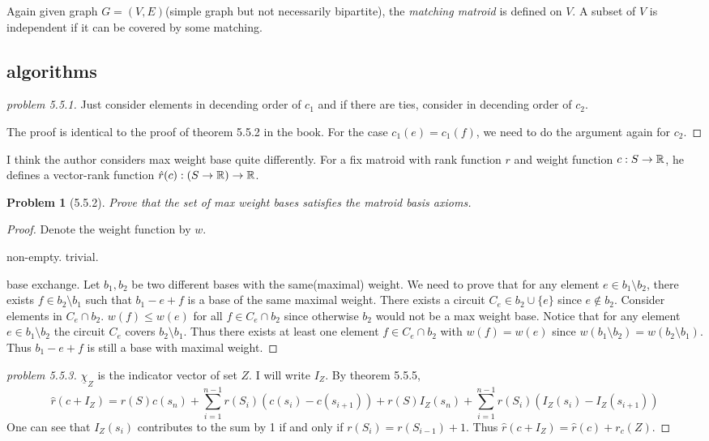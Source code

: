 \documentclass[12pt]{article}
\newtheorem*{nproblem}{Problem}
\begin{document}
Again given graph $G=(V,E)$(simple graph but not necessarily bipartite), the \emph{matching matroid} is defined on $V$. A subset of $V$ is independent if it can be covered by some matching. 

\subsection{algorithms}
\begin{proof}[problem 5.5.1]
    Just consider elements in decending order of $c_1$ and if there are ties, consider in decending order of $c_2$.

    The proof is identical to the proof of theorem 5.5.2 in the book. For the case $c_1(e)=c_1(f)$, we need to do the argument again for $c_2$.
\end{proof}

I think the author considers max weight base quite differently. For a fix matroid with rank function $r$ and weight function $c:S\to \R$, he defines a vector-rank function $\hat{r}(c):(S\to \R )\to \R$.

\begin{nproblem}[5.5.2]
    Prove that the set of max weight bases satisfies the matroid basis axioms.
\end{nproblem}
\begin{proof}
    Denote the weight function by $w$.

    non-empty. trivial.

    base exchange. Let $b_1,b_2$ be two different bases with the same(maximal) weight. We need to prove that for any element $e\in b_1\setminus b_2$, there exists $f\in b_2\setminus b_1$ such that $b_1-e+f$ is a base of the same maximal weight. There exists a circuit $C_e\in b_2\cup\{e\}$ since $e\notin b_2$. Consider elements in $C_e\cap b_2$. $w(f)\leq w(e)$ for all $f\in C_e\cap b_2$ since otherwise $b_2$ would not be a max weight base. Notice that for any element $e\in b_1\setminus b_2$ the circuit $C_e$ covers $b_2\setminus b_1$. Thus there exists at least one element $f\in C_e\cap b_2$ with $w(f)=w(e)$ since $w(b_1\setminus b_2)=w(b_2\setminus b_1)$. Thus $b_1-e+f$ is still a base with maximal weight.
\end{proof}

\begin{proof}[problem 5.5.3]
    $\underline{\chi}_{Z}$ is the indicator vector of set $Z$. I will write $I_Z$. By theorem 5.5.5, 
    \[
        \hat{r}(c+I_Z)=r(S)c(s_n)+\sum_{i=1}^{n-1} r(S_i)\left( c(s_i)-c(s_{i+1})\right)+r(S)I_Z(s_n)+\sum_{i=1}^{n-1} r(S_i)\left( I_Z(s_i)-I_Z(s_{i+1})\right)
    \]
    One can see that $I_Z(s_i)$ contributes to the sum by 1 if and only if $r(S_i)=r(S_{i-1})+1$. Thus $\hat{r}(c+I_Z)=\hat r(c)+r_c(Z)$.

\end{proof}
\end{document}
